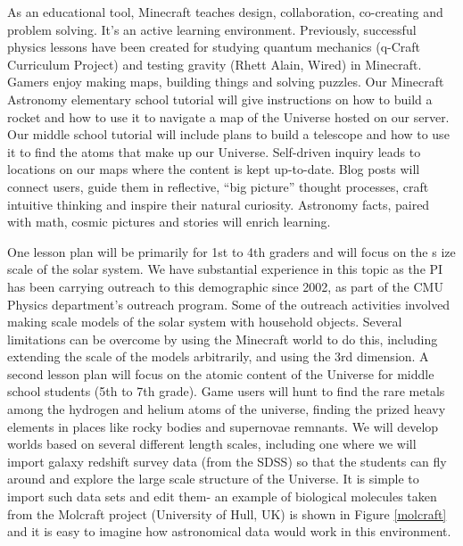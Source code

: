 As an educational tool, Minecraft teaches design, collaboration, co-creating 
and problem solving. It’s an active learning environment. Previously, 
successful
 physics lessons have been created for studying quantum mechanics 
(q-Craft Curriculum Project) and testing gravity (Rhett Alain, Wired) in 
Minecraft. Gamers enjoy making maps, building things and solving puzzles. 
Our 
Minecraft Astronomy elementary school tutorial will give instructions on 
how to 
build a rocket and how to use it to navigate a map of the Universe hosted 
on our server. Our middle school tutorial will include plans to build a 
telescope and 
how to use it to find the atoms that make up our Universe. Self-driven 
inquiry 
leads to locations on our maps where the content is kept up-to-date.
 Blog 
posts will connect users, guide them in reflective, 
“big picture” 
thought processes, craft intuitive thinking and inspire their natural 
curiosity. 
Astronomy facts, paired with math, cosmic pictures and stories will 
enrich learning.
 
One lesson plan will be primarily for 1st to 4th graders and will focus on the s
ize scale of the solar system.
We have substantial experience in this topic as the PI has been
carrying outreach to this demographic since 2002, as part of the CMU
Physics department's outreach program. Some of the outreach activities
involved making scale models of the solar system with household objects. 
Several limitations can be overcome by using the Minecraft world to do this, 
including  extending the scale of the models arbitrarily, and using the 
3rd dimension.
 A second lesson plan will focus on the atomic content of 
the Universe for middle school students (5th to 7th grade). Game users 
will hunt to  find the rare metals among the hydrogen and helium 
atoms of the universe, finding 
the prized heavy elements in places like rocky bodies and supernovae remnants. 
We will develop worlds based on several different length scales, including
one where we will import galaxy redshift survey data (from the SDSS) so that 
the students can fly around and explore 
the large scale structure of the Universe.
It is simple to import such data sets and edit them- an example
of biological molecules taken 
from the Molcraft project (University of Hull, UK) is shown in Figure 
\ref{molcraft} and it is easy to imagine how astronomical data would work
in this environment.


